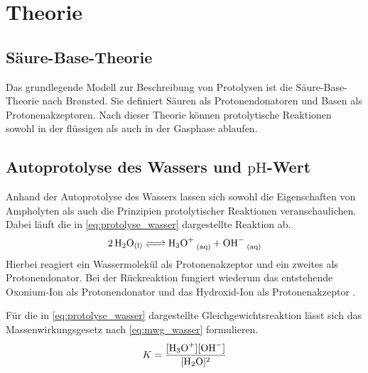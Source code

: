 \section{Theorie}

\subsection{Säure-Base-Theorie}

Das grundlegende Modell zur Beschreibung von Protolysen ist die Säure-Base-Theorie nach Brønsted. Sie definiert Säuren als Protonendonatoren und Basen als Protonenakzeptoren. Nach dieser Theorie können protolytische Reaktionen sowohl in der flüssigen als auch in der Gasphase ablaufen.

\subsection{Autoprotolyse des Wassers und $\text{pH}$-Wert}

Anhand der Autoprotolyse des Wassers lassen sich sowohl die Eigenschaften von Ampholyten als auch die Prinzipien protolytischer Reaktionen veranschaulichen. Dabei läuft die in \eqref{eq:protolyse_wasser} dargestellte Reaktion ab.
\begin{equation}
    \ce{2H2O_{\mathrm{(l)}} <=> H3O+ _{\mathrm{(aq)}} + OH- _{\mathrm{(aq)}}}
    \label{eq:protolyse_wasser}
\end{equation}
Hierbei reagiert ein Wassermolekül als Protonenakzeptor und ein zweites als Protonendonator. Bei der Rückreaktion fungiert wiederum das entstehende Oxonium-Ion als Protonendonator und das Hydroxid-Ion als Protonenakzeptor \cite{skript}.

Für die in \eqref{eq:protolyse_wasser} dargestellte Gleichgewichtsreaktion lässt sich das Massenwirkungsgesetz nach \eqref{eq:mwg_wasser} formulieren.
\begin{equation}
    K = \frac{[\ce{H3O+}][\ce{OH-}]}{[\ce{H2O}]^2}
    \label{eq:mwg_wasser}
\end{equation}


